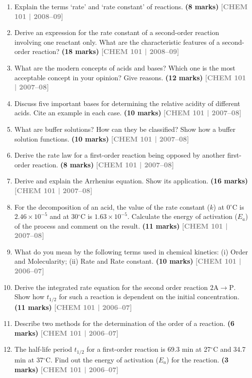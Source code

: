 \documentclass[12pt,a3paper]{article}
\newcommand{\yr}[1]{\hfill\textcolor{gray}{\small\textbf{[#1]}}}
\newcommand{\mk}[1]{\textcolor{orange!70!black}{\small\textbf{(#1 marks)}}}
\begin{document}
\begin{enumerate}
\item Explain the terms `rate' and `rate constant' of reactions. \mk{8}
\yr{CHEM 101 | 2008--09}

\item Derive an expression for the rate constant of a second-order reaction involving one reactant only. What are the characteristic features of a second-order reaction? \mk{18}
\yr{CHEM 101 | 2008--09}

\item What are the modern concepts of acids and bases? Which one is the most acceptable concept in your opinion? Give reasons. \mk{12}
\yr{CHEM 101 | 2007--08}

\item Discuss five important bases for determining the relative acidity of different acids. Cite an example in each case. \mk{10}
\yr{CHEM 101 | 2007--08}

\item What are buffer solutions? How can they be classified? Show how a buffer solution functions. \mk{10}
\yr{CHEM 101 | 2007--08}

\item Derive the rate law for a first-order reaction being opposed by another first-order reaction. \mk{8}
\yr{CHEM 101 | 2007--08}

\item Derive and explain the Arrhenius equation. Show its application. \mk{16}
\yr{CHEM 101 | 2007--08}

\item For the decomposition of an acid, the value of the rate constant ($k$) at 0$^\circ$C is $2.46 \times 10^{-5}$ and at 30$^\circ$C is $1.63 \times 10^{-5}$. Calculate the energy of activation ($E_a$) of the process and comment on the result. \mk{11}
\yr{CHEM 101 | 2007--08}

\item What do you mean by the following terms used in chemical kinetics: (i) Order and Molecularity; (ii) Rate and Rate constant. \mk{10}
\yr{CHEM 101 | 2006--07}

\item Derive the integrated rate equation for the second order reaction $2\text{A} \rightarrow \text{P}$. Show how $t_{1/2}$ for such a reaction is dependent on the initial concentration. \mk{11}
\yr{CHEM 101 | 2006--07}

\item Describe two methods for the determination of the order of a reaction. \mk{6}
\yr{CHEM 101 | 2006--07}

\item The half-life period $t_{1/2}$ for a first-order reaction is 69.3 min at 27$^\circ$C and 34.7 min at 37$^\circ$C. Find out the energy of activation ($E_a$) for the reaction. \mk{3}
\yr{CHEM 101 | 2006--07}

\end{enumerate}
\end{document}
